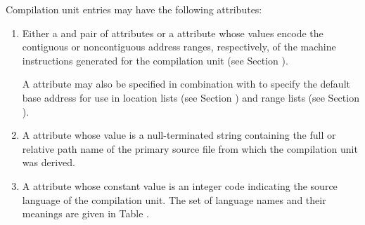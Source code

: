 Compilation unit entries may have the following 
attributes:
\begin{enumerate}[1. ]
\item Either a \DWATlowpc{} and 
\DWAThighpc{} pair of
attributes 
or 
a 
\DWATranges{} attribute
whose values encode 
the
contiguous or 
non\dash contiguous address ranges, respectively,
of the machine instructions generated for the compilation
unit (see Section ).
  
A \DWATlowpc{} attribute 
may also be specified in combination 
with 
\DWATranges{} to specify the
default base address for use in 
location lists (see Section
) and range lists 
(see Section ).

\item A \DWATnameDEFN{} attribute 
whose value is a null-terminated string 
\hypertarget{chap:DWATnamepathnameofcompilationsource}{}
containing the full or relative path name of the primary
source file from which the compilation unit was derived.

\item A \DWATlanguageDEFN{} attribute 
whose constant value is an
\hypertarget{chap:DWATlanguageprogramminglanguage}{}
integer code 
indicating the source language of the compilation
unit. The set of language names and their meanings are given
in Table .


\end{enumerate}

